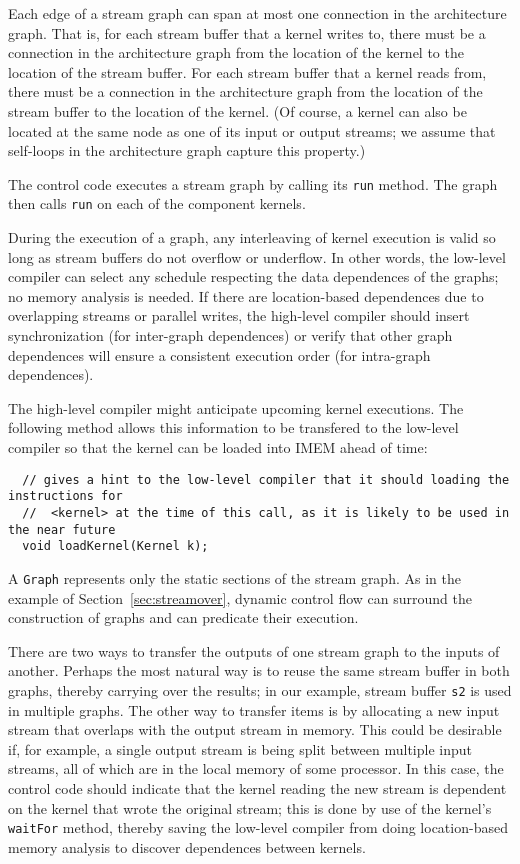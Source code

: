 Each edge of a stream graph can span at most one connection in the
architecture graph.  That is, for each stream buffer that a kernel
writes to, there must be a connection in the architecture graph from
the location of the kernel to the location of the stream buffer.  For
each stream buffer that a kernel reads from, there must be a
connection in the architecture graph from the location of the stream
buffer to the location of the kernel.  (Of course, a kernel can also
be located at the same node as one of its input or output streams; we
assume that self-loops in the architecture graph capture this
property.)


The control code executes a stream graph by calling its {\tt run}
method.  The graph then calls {\tt run} on each of the component
kernels.  

During the execution of a graph, any interleaving of kernel execution
is valid so long as stream buffers do not overflow or underflow.  In
other words, the low-level compiler can select any schedule respecting
the data dependences of the graphs; no memory analysis is needed.  If
there are location-based dependences due to overlapping streams or
parallel writes, the high-level compiler should insert synchronization
(for inter-graph dependences) or verify that other graph dependences
will ensure a consistent execution order (for intra-graph
dependences).

The high-level compiler might anticipate upcoming kernel executions.
The following method allows this information to be transfered to the
low-level compiler so that the kernel can be loaded into IMEM ahead of
time:
\begin{verbatim}
  // gives a hint to the low-level compiler that it should loading the instructions for
  //  <kernel> at the time of this call, as it is likely to be used in the near future
  void loadKernel(Kernel k);
\end{verbatim}


A {\tt Graph} represents only the static sections of the stream graph.
As in the example of Section~\ref{sec:streamover}, dynamic control
flow can surround the construction of graphs and can predicate their
execution.

There are two ways to transfer the outputs of one stream graph to the
inputs of another.  Perhaps the most natural way is to reuse the same
stream buffer in both graphs, thereby carrying over the results; in
our example, stream buffer {\tt s2} is used in multiple graphs.  The
other way to transfer items is by allocating a new input stream that
overlaps with the output stream in memory.  This could be desirable
if, for example, a single output stream is being split between
multiple input streams, all of which are in the local memory of some
processor.  In this case, the control code should indicate that the
kernel reading the new stream is dependent on the kernel that wrote
the original stream; this is done by use of the kernel's {\tt waitFor}
method, thereby saving the low-level compiler from doing
location-based memory analysis to discover dependences between
kernels.


